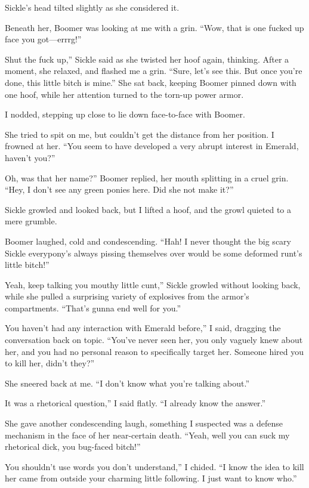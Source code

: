 Sickle’s head tilted slightly as she considered it.

Beneath her, Boomer was looking at me with a grin. “Wow, that is one fucked up face you got—errrg!”

\leavevmode{}Shut the fuck up,” Sickle said as she twisted her hoof again, thinking. After a moment, she relaxed, and flashed me a grin. “Sure, let’s see this. But once you’re done, this little bitch is mine.” She sat back, keeping Boomer pinned down with one hoof, while her attention turned to the torn-up power armor.

I nodded, stepping up close to lie down face-to-face with Boomer.

She tried to spit on me, but couldn’t get the distance from her position. I frowned at her. “You seem to have developed a very abrupt interest in Emerald, haven’t you?”

\leavevmode{}Oh, was that her name?” Boomer replied, her mouth splitting in a cruel grin. “Hey, I don’t see any green ponies here. Did she not make it?”

Sickle growled and looked back, but I lifted a hoof, and the growl quieted to a mere grumble.

Boomer laughed, cold and condescending. “Hah! I never thought the big scary Sickle everypony’s always pissing themselves over would be some deformed runt’s little bitch!”

\leavevmode{}Yeah, keep talking you mouthy little cunt,” Sickle growled without looking back, while she pulled a surprising variety of explosives from the armor’s compartments. “That’s gunna end well for you.”

\leavevmode{}You haven’t had any interaction with Emerald before,” I said, dragging the conversation back on topic. “You’ve never seen her, you only vaguely knew about her, and you had no personal reason to specifically target her. Someone hired you to kill her, didn’t they?”

She sneered back at me. “I don’t know what you’re talking about.”

\leavevmode{}It was a rhetorical question,” I said flatly. “I already know the answer.”

She gave another condescending laugh, something I suspected was a defense mechanism in the face of her near-certain death. “Yeah, well you can suck my rhetorical dick, you bug-faced bitch!”

\leavevmode{}You shouldn’t use words you don’t understand,” I chided. “I know the idea to kill her came from outside your charming little following. I just want to know who.”

